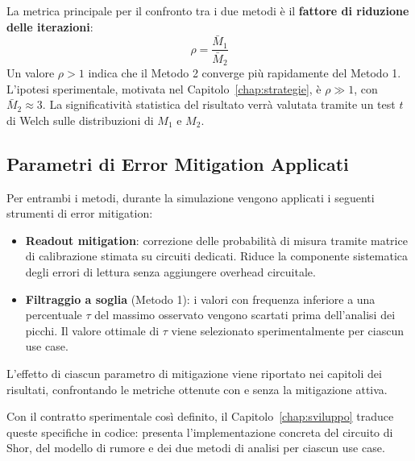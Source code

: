 \begin{onehalfspace}
La metrica principale per il confronto tra i due metodi è il \textbf{fattore di riduzione delle iterazioni}:
\begin{equation}
    \rho = \frac{\bar{M}_1}{\bar{M}_2}
    \label{eq:fattore_riduzione}
\end{equation}
Un valore $\rho > 1$ indica che il Metodo 2 converge più rapidamente del Metodo 1. L'ipotesi sperimentale, motivata nel Capitolo~\ref{chap:strategie}, è $\rho \gg 1$, con $\bar{M}_2 \approx 3$. La significatività statistica del risultato verrà valutata tramite un test $t$ di Welch sulle distribuzioni di $M_1$ e $M_2$.

\subsection{Parametri di Error Mitigation Applicati}

Per entrambi i metodi, durante la simulazione vengono applicati i seguenti strumenti di error mitigation:

\begin{itemize}
    \item \textbf{Readout mitigation}: correzione delle probabilità di misura tramite matrice di calibrazione stimata su circuiti dedicati. Riduce la componente sistematica degli errori di lettura senza aggiungere overhead circuitale.
    \item \textbf{Filtraggio a soglia} (Metodo 1): i valori con frequenza inferiore a una percentuale $\tau$ del massimo osservato vengono scartati prima dell'analisi dei picchi. Il valore ottimale di $\tau$ viene selezionato sperimentalmente per ciascun use case.
\end{itemize}

L'effetto di ciascun parametro di mitigazione viene riportato nei capitoli dei risultati, confrontando le metriche ottenute con e senza la mitigazione attiva.

Con il contratto sperimentale così definito, il Capitolo~\ref{chap:sviluppo} traduce queste specifiche in codice: presenta l'implementazione concreta del circuito di Shor, del modello di rumore e dei due metodi di analisi per ciascun use case.

\end{onehalfspace}
